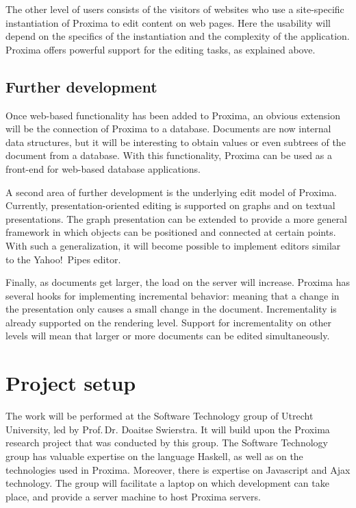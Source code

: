 \documentclass[10pt]{article}
\begin{document}
The other level of users consists of the visitors of websites who use a site-specific instantiation of Proxima to edit content on web pages. Here the usability will depend on the specifics of the instantiation and the complexity of the application. Proxima offers powerful support for the editing tasks, as explained above.



\subsection{Further development}\label{sect:FurtherDevelopment}


Once web-based functionality has been added to Proxima, an obvious extension will be the connection of Proxima to a database. Documents are now internal data structures, but it will be interesting to obtain values or even subtrees of the document from a database. With this functionality, Proxima can be used as a front-end for web-based database applications.

A second area of further development is the underlying edit model of Proxima. Currently, presentation-oriented editing is supported on graphs and on textual presentations. The graph presentation can be extended to provide a more general framework in which objects can be positioned and connected at certain points. With such a generalization, it will become possible to implement editors similar to the Yahoo!\ Pipes editor.

Finally, as documents get larger, the load on the server will increase. Proxima has several hooks for implementing incremental behavior: meaning that a change in the presentation only causes a small change in the document. Incrementality is already supported on the rendering level. Support for incrementality on other levels will mean that larger or more documents can be edited simultaneously.


\section{Project setup}

The work will be performed at the Software Technology group of Utrecht University, led by Prof.\,Dr. Doaitse Swierstra. It will build upon the Proxima research project that was conducted by this group. The Software Technology group has valuable expertise on the language Haskell, as well as on the technologies used in Proxima. Moreover, there is expertise on Javascript and Ajax technology. The group will facilitate a laptop on which development can take place, and provide a server machine to host Proxima servers.
\end{document}
